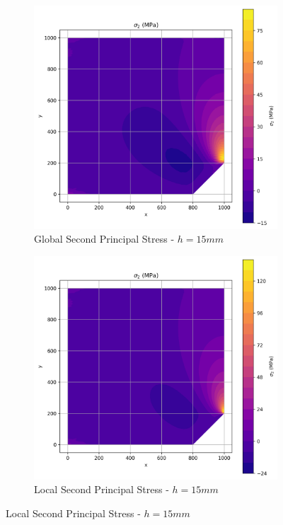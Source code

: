 \begin{figure}[H]
  \centering
  \begin{subfigure}[b]{0.45\textwidth}
    \centering
    \includegraphics[width=\textwidth]{GRAFICOS/Quad9/1.75mm_global/resultados - sigma_2.png}
    \caption{Global Second Principal Stress - $h=15mm$}
    \label{fig:img11}
  \end{subfigure}
  \hfill
  \begin{subfigure}[b]{0.45\textwidth}
    \centering
    \includegraphics[width=\textwidth]{GRAFICOS/Quad9/1.75mm_local/resultados - sigma_2.png}
    \caption{Local Second Principal Stress - $h=15mm$}
    \label{fig:img21}
  \end{subfigure}
\end{figure}

